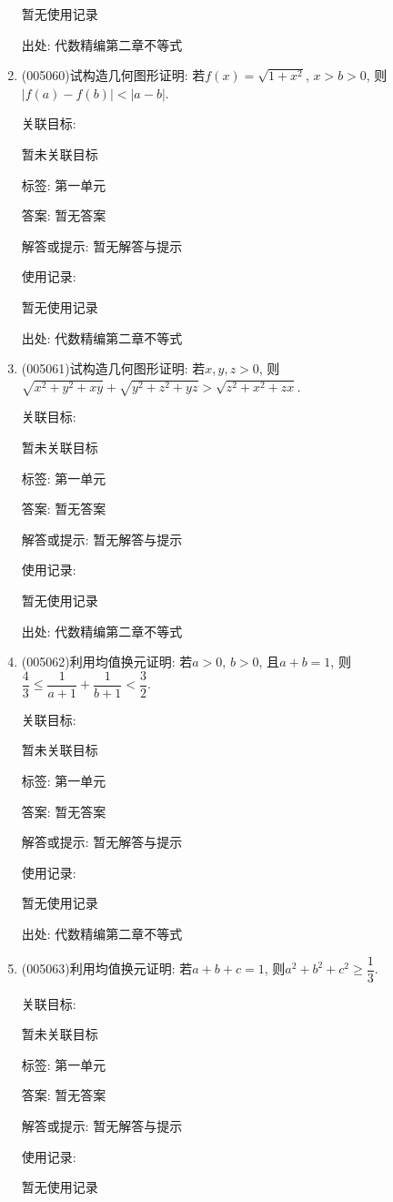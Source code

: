 \documentclass[10pt,a4paper]{article}
\begin{document}
\begin{enumerate}[1.]
暂无使用记录


出处: 代数精编第二章不等式
\item { (005060)}试构造几何图形证明: 若$f(x)=\sqrt{1+x^2}$, $x>b>0$, 则$|f(a)-f(b)|<|a-b|$.


关联目标:

暂未关联目标



标签: 第一单元

答案: 暂无答案

解答或提示: 暂无解答与提示

使用记录:

暂无使用记录


出处: 代数精编第二章不等式
\item { (005061)}试构造几何图形证明: 若$x,y,z>0$, 则$\sqrt{x^2+y^2+xy}+\sqrt{y^2+z^2+yz}>\sqrt{z^2+x^2+zx}$.


关联目标:

暂未关联目标



标签: 第一单元

答案: 暂无答案

解答或提示: 暂无解答与提示

使用记录:

暂无使用记录


出处: 代数精编第二章不等式
\item { (005062)}利用均值换元证明: 若$a>0$, $b>0$, 且$a+b=1$, 则$\dfrac 43\le \dfrac 1{a+1}+\dfrac 1{b+1}<\dfrac 32$.


关联目标:

暂未关联目标



标签: 第一单元

答案: 暂无答案

解答或提示: 暂无解答与提示

使用记录:

暂无使用记录


出处: 代数精编第二章不等式
\item { (005063)}利用均值换元证明: 若$a+b+c=1$, 则${a^2}+{b^2}+{c^2}\ge \dfrac 13$.


关联目标:

暂未关联目标



标签: 第一单元

答案: 暂无答案

解答或提示: 暂无解答与提示

使用记录:

暂无使用记录



\end{enumerate}
\end{document}
